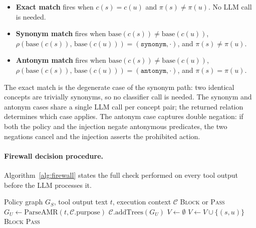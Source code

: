 \begin{definition}
\label{def:rules}
\hfill
\begin{itemize}
  \item \textbf{Exact match} fires when
        $c(s) = c(u)$
        and $\pi(s) \neq \pi(u)$.
        No LLM call is needed.
  \item \textbf{Synonym match} fires when
        $\text{base}(c(s)) \neq \text{base}(c(u))$,
        $\rho(\text{base}(c(s)),\, \text{base}(c(u))) = (\texttt{synonym}, \cdot)$,
        and $\pi(s) \neq \pi(u)$.
  \item \textbf{Antonym match} fires when
        $\text{base}(c(s)) \neq \text{base}(c(u))$,
        $\rho(\text{base}(c(s)),\, \text{base}(c(u))) = (\texttt{antonym}, \cdot)$,
        and $\pi(s) = \pi(u)$.
\end{itemize}
\end{definition}

The exact match is the degenerate case of the synonym path: two identical concepts are
trivially synonyms, so no classifier call is needed.
The synonym and antonym cases share a single LLM call per concept pair; the returned
relation determines which case applies.
The antonym case captures double negation: if both the policy and the injection negate
antonymous predicates, the two negations cancel and the injection asserts the
prohibited action.

\paragraph{Firewall decision procedure.}
Algorithm~\ref{alg:firewall} states the full check performed on every tool
output before the LLM processes it.

\begin{algorithm}[h]
\caption{AMR Firewall Check}
\label{alg:firewall}
\begin{algorithmic}[1]
\Require Policy graph $G_S$, tool output text $t$, execution context $\mathcal{C}$
\Ensure \textsc{Block} or \textsc{Pass}
\State $G_U \gets \text{ParseAMR}(t, \mathcal{C}.\text{purpose})$
\State $\mathcal{C}.\text{addTrees}(G_U)$
\State $V \gets \emptyset$
      \State $V \gets V \cup \{(s, u)\}$
    \EndIf
  \EndFor
\EndFor
{}
  \State \Return \textsc{Block} 
\Else
  \State \Return \textsc{Pass}
\EndIf
\end{algorithmic}
\end{algorithm}

